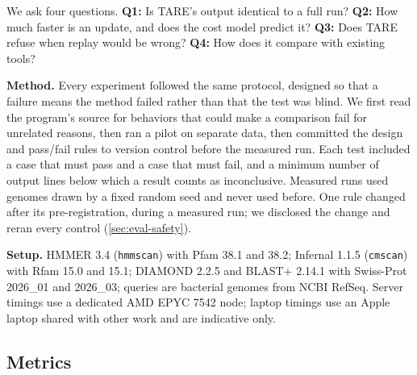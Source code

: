 \documentclass[letterpaper,twocolumn,10pt]{article}
\theoremstyle{definition}
\newcommand{\sys}{TARE\xspace}
\newcommand{\sys}{PARE\xspace}
\begin{document}
We ask four questions. \textbf{Q1:} Is \sys's output identical to a full run? \textbf{Q2:} How much faster is an
update, and does the cost model predict it? \textbf{Q3:} Does \sys refuse when replay would be wrong? \textbf{Q4:} How
does it compare with existing tools?

\textbf{Method.} Every experiment followed the same protocol, designed so that a failure means the method failed rather
than that the test was blind. We first read the program's source for behaviors that could make a comparison fail for
unrelated reasons, then ran a pilot on separate data, then committed the design and pass/fail rules to version control
before the measured run. Each test included a case that must pass and a case that must fail, and a minimum number of
output lines below which a result counts as inconclusive. Measured runs used genomes drawn by a fixed random seed and
never used before. One rule changed after its pre\nobreakdash-registration, during a measured run; we disclosed the change and
reran every control (\cref{sec:eval-safety}).

\textbf{Setup.} HMMER 3.4 (\texttt{hmmscan}) with Pfam 38.1 and 38.2; Infernal 1.1.5 (\texttt{cmscan}) with Rfam 15.0
and 15.1; DIAMOND 2.2.5 and BLAST+ 2.14.1 with Swiss\nobreakdash-Prot 2026\_01 and 2026\_03; queries are bacterial genomes from NCBI
RefSeq. Server timings use a dedicated AMD EPYC 7542 node; laptop timings use an Apple laptop shared with other work and
are indicative only.

\subsection{Metrics}
\label{sec:metrics}
\end{document}
